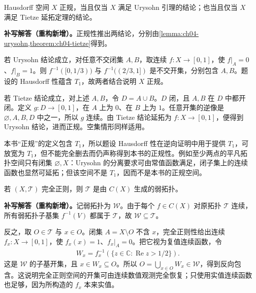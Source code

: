 \documentclass[../../main.tex]{subfiles}%
\begin{document}
\begin{exercise}\label{exercise:ch04-normal-equivalences}
Hausdorff 空间 $X$ 正规，当且仅当 $X$ 满足 Urysohn 引理的结论；也当且仅当 $X$ 满足 Tietze 延拓定理的结论。
\end{exercise}
\begin{solution}
\textbf{补写解答（重构新增）。}正规性推出两结论，分别由\cref{lemma:ch04-urysohn,theorem:ch04-tietze}得到。

若 Urysohn 结论成立，对任意不交闭集 $A,B$，取连续 $f:X\to[0,1]$，使 $f|_A=0$、$f|_B=1$。则 $f^{-1}([0,1/3))$ 与 $f^{-1}((2/3,1])$ 是不交开集，分别包含 $A,B$。题设的 Hausdorff 性蕴含 $T_1$，故两者结合说明 $X$ 正规。

若 Tietze 结论成立，对上述 $A,B$，令 $D=A\cup B$。$D$ 闭，且 $A,B$ 在 $D$ 中都开闭。定义 $g:D\to[0,1]$，在 $A$ 上为 $0$、在 $B$ 上为 $1$。任意开集的逆像是 $\varnothing,A,B,D$ 中之一，所以 $g$ 连续。由 Tietze 结论延拓为 $f:X\to[0,1]$，便得到 Urysohn 结论，进而正规。空集情形同样适用。

本书“正规”的定义包含 $T_1$，所以题设 Hausdorff 性在逆向证明中用于提供 $T_1$，可放宽为 $T_1$，但不能完全删去而仍声称得到本书的正规性。例如至少两点的平凡拓扑空间只有闭集 $\varnothing,X$：Urysohn 的分离要求可由常值函数满足，闭子集上的连续函数也显然可延拓；但该空间不是 $T_1$，因而不是本书的正规空间。
\end{solution}
\begin{exercise}\label{exercise:ch04-weak-continuous-functions}
若 $(X,\mathcal T)$ 完全正则，则 $\mathcal T$ 是由 $C(X)$ 生成的弱拓扑。
\end{exercise}
\begin{solution}
\textbf{补写解答（重构新增）。}记弱拓扑为 $\mathcal W$。由于每个 $f\in C(X)$ 对原拓扑 $\mathcal T$ 连续，所有弱拓扑子基集 $f^{-1}(V)$ 都属于 $\mathcal T$，故 $\mathcal W\subseteq\mathcal T$。

反之，取 $O\in\mathcal T$ 与 $x\in O$。闭集 $A=X\setminus O$ 不含 $x$，完全正则性给出连续 $f_x:X\to[0,1]$，使 $f_x(x)=1$、$f_x|_A=0$。把它视为复值连续函数，令
\begin{align*}
W_x=f_x^{-1}(\{z\in\mathbb C:\operatorname{Re}z>1/2\}).
\end{align*}
这是 $\mathcal W$ 的子基开集，且 $x\in W_x\subseteq O$。所以 $O=\bigcup_{x\in O}W_x\in\mathcal W$，得到反向包含。这说明完全正则空间的开集可由连续数值观测完全恢复；只使用实值连续函数也足够，因为所构造的 $f_x$ 本来实值。
\end{solution}
\end{document}
